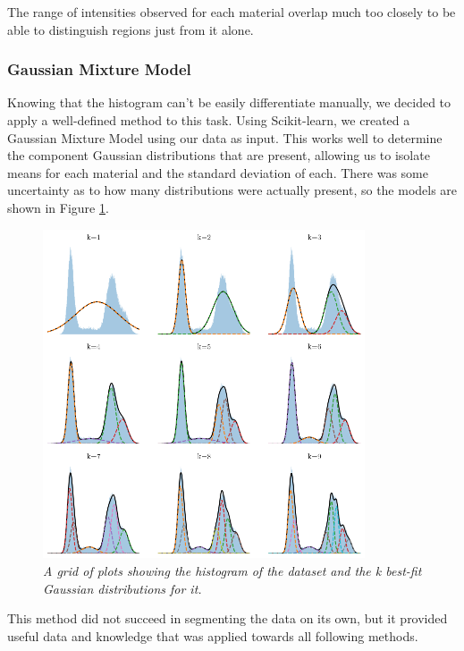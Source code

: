 \documentclass[11pt, letterpaper]{article}
\begin{document}
        The range of intensities observed for each material  overlap much too closely to be able to distinguish regions just from it alone.

    \subsubsection{Gaussian Mixture Model}
        Knowing that the histogram can't be easily differentiate manually, we decided to apply a well-defined method to this task. Using Scikit-learn, we created a Gaussian Mixture Model using our data as input. This works well to determine the component Gaussian distributions that are present, allowing us to isolate means for each material and the standard deviation of each. There was some uncertainty as to how many distributions were actually present, so the models are shown in Figure \ref{fig:GMM}.

        \begin{figure}[H]
            \centering
            \label{fig:GMM}
            \includegraphics[width=0.85\textwidth]{GMM.png}
            \caption{\emph{A grid of plots showing the histogram of the dataset and the k best-fit Gaussian distributions for it.}}
        \end{figure}

        This method did not succeed in segmenting the data on its own, but it provided useful data and knowledge that was applied towards all following methods.
\end{document}
